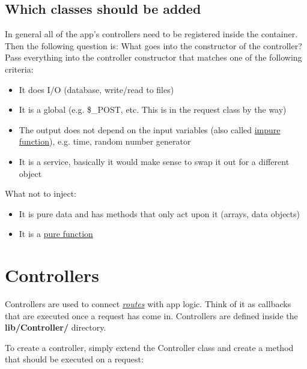 \documentclass[letterpaper,10pt,english]{sphinxmanual}
\begin{document}
\subsection{Which classes should be added}
\label{app/container:which-classes-should-be-added}
In general all of the app's controllers need to be registered inside the container. Then the following question is: What goes into the constructor of the controller? Pass everything into the controller constructor that matches one of the following criteria:
\begin{itemize}
\item {} 
It does I/O (database, write/read to files)

\item {} 
It is a global (e.g. \$\_POST, etc. This is in the request class by the way)

\item {} 
The output does not depend on the input variables (also called \href{http://en.wikipedia.org/wiki/Pure\_function}{impure function}), e.g. time, random number generator

\item {} 
It is a service, basically it would make sense to swap it out for a different object

\end{itemize}

What not to inject:
\begin{itemize}
\item {} 
It is pure data and has methods that only act upon it (arrays, data objects)

\item {} 
It is a \href{http://en.wikipedia.org/wiki/Pure\_function}{pure function}

\end{itemize}


\section{Controllers}
\label{app/controllers:controllers}\label{app/controllers::doc}
Controllers are used to connect {\hyperref[app/routes::doc]{\emph{routes}}} with app logic. Think of it as callbacks that are executed once a request has come in. Controllers are defined inside the \textbf{lib/Controller/} directory.

To create a controller, simply extend the Controller class and create a method that should be executed on a request:
\end{document}
